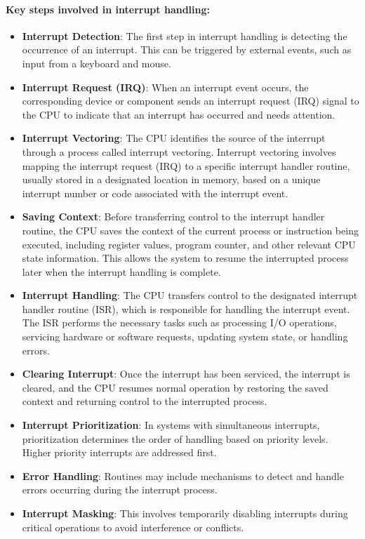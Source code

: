 \documentclass[12pt,a4paper]{article}
\begin{document}
\paragraph{Key steps involved in interrupt handling:}
\begin{itemize}
    \item \textbf{Interrupt Detection}: The first step in interrupt handling is detecting the occurrence of an interrupt. This can be triggered by external events, such as input from a keyboard and mouse.
    \item \textbf{Interrupt Request (IRQ)}: When an interrupt event occurs, the corresponding device or component sends an interrupt request (IRQ) signal to the CPU to indicate that an interrupt has occurred and needs attention.
    \item \textbf{Interrupt Vectoring}: The CPU identifies the source of the interrupt through a process called interrupt vectoring. Interrupt vectoring involves mapping the interrupt request (IRQ) to a specific interrupt handler routine, usually stored in a designated location in memory, based on a unique interrupt number or code associated with the interrupt event.
    \item \textbf{Saving Context}: Before transferring control to the interrupt handler routine, the CPU saves the context of the current process or instruction being executed, including register values, program counter, and other relevant CPU state information. This allows the system to resume the interrupted process later when the interrupt handling is complete.
    \item \textbf{Interrupt Handling}: The CPU transfers control to the designated interrupt handler routine (ISR), which is responsible for handling the interrupt event. The ISR performs the necessary tasks such as processing I/O operations, servicing hardware or software requests, updating system state, or handling errors.
    \item \textbf{Clearing Interrupt}: Once the interrupt has been serviced, the interrupt is cleared, and the CPU resumes normal operation by restoring the saved context and returning control to the interrupted process.
    \item \textbf{Interrupt Prioritization}: In systems with simultaneous interrupts, prioritization determines the order of handling based on priority levels. Higher priority interrupts are addressed first.
    \item \textbf{Error Handling}: Routines may include mechanisms to detect and handle errors occurring during the interrupt process.
    \item \textbf{Interrupt Masking}: This involves temporarily disabling interrupts during critical operations to avoid interference or conflicts.
\end{itemize}
\end{document}
